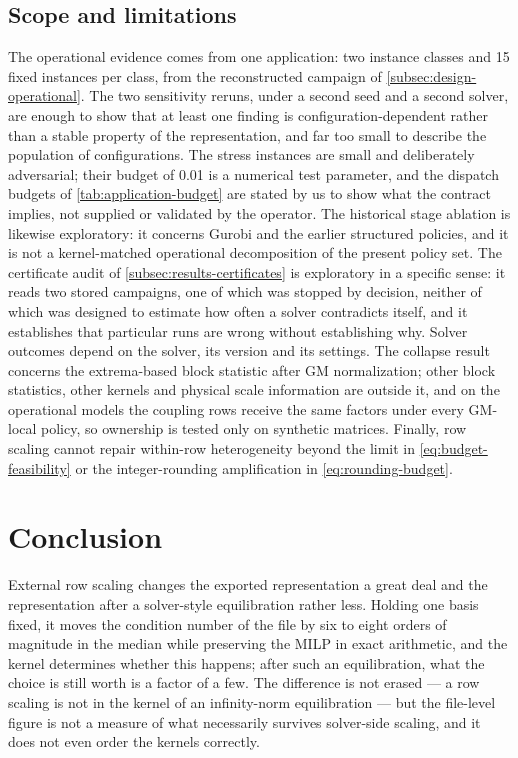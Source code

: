 \documentclass[smallextended,envcountsect,envcountsame]{svjour3}
\begin{document}
\subsection{Scope and limitations}
The operational evidence comes from one application: two instance classes and 15 fixed
instances per class, from the reconstructed campaign of \cref{subsec:design-operational}. The two
sensitivity reruns, under a second seed and a second solver, are enough to show that at least
one finding is configuration-dependent rather than a stable property of the representation, and
far too small to describe the population of configurations. The stress instances are small and
deliberately adversarial; their budget of 0.01 is a numerical test parameter, and the dispatch
budgets of \cref{tab:application-budget} are stated by us to show what the contract implies,
not supplied or validated by the operator. The historical stage ablation is likewise
exploratory: it concerns Gurobi and the earlier structured policies, and it is not a
kernel-matched operational decomposition of the present policy set. The certificate audit of
\cref{subsec:results-certificates} is exploratory in a specific sense: it reads two stored
campaigns, one of which was stopped by decision, neither of which was designed to estimate how
often a solver contradicts itself, and it establishes that particular runs are wrong without
establishing why. Solver outcomes depend on the solver, its version and its settings. The collapse result concerns the extrema-based block
statistic after GM normalization; other block statistics, other kernels and physical scale
information are outside it, and on the operational models the coupling rows receive the same
factors under every GM-local policy, so ownership is tested only on synthetic matrices. Finally, row scaling cannot repair within-row
heterogeneity beyond the limit in \eqref{eq:budget-feasibility} or the integer-rounding
amplification in \eqref{eq:rounding-budget}.

\section{Conclusion}
External row scaling changes the exported representation a great deal and the representation
after a solver-style equilibration rather less. Holding one basis fixed, it moves the condition
number of the file by six to eight orders of magnitude in the median while preserving the MILP
in exact arithmetic, and the kernel determines whether this happens; after such an
equilibration, what the choice is still worth is a factor of a few. The difference is not
erased --- a row scaling is not in the kernel of an infinity-norm equilibration --- but the
file-level figure is not a measure of what necessarily survives solver-side scaling, and it
does not even order the kernels correctly.
\end{document}
